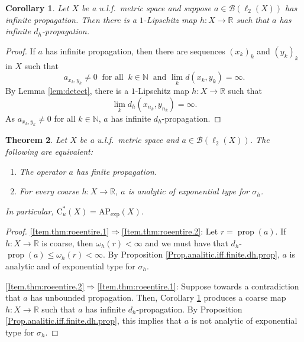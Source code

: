 \documentclass[11pt]{amsart}
\newcommand{\R}{\mathbb{R}}
\newcommand{\N}{\mathbb{N}}
\newcommand{\B}{\mathcal{B}}
\newcommand{\cstu}{\mathrm{C}^*_u}
\numberwithin{equation}{section}
\newtheorem{theorem}{Theorem}[section]
\newtheorem{corollary}[theorem]{Corollary}
\theoremstyle{definition}
\theoremstyle{remark}
\DeclareMathOperator{\propg}{prop}
\begin{document}
\begin{corollary}\label{cor:detect} Let $X$ be a u.l.f.\ metric space and suppose $a\in\B(\ell_2(X))$ has infinite propagation. Then there is a $1$-Lipschitz map $h\colon X\to\R$ such that $a$ has infinite $d_h$-propagation.
\end{corollary}

\begin{proof}
If  $a$ has infinite propagation, then there are   sequences $(x_k)_k$ and $(y_k)_k$ in $X$ such that
\begin{equation*}
a_{x_k,y_k}\neq 0\ \text{ for all }\ k\in \N\ \text{ and }\lim_kd(x_k,y_k)=\infty.
\end{equation*}
By Lemma \ref{lem:detect}, there is a $1$-Lipschitz map $h\colon X\to \R$ such that \[\lim_kd_h(x_{n_k},y_{n_k})=\infty.\] As $a_{x_k,y_k}\neq 0$ for all $k\in\N$, $a$ has infinite $d_h$-propagation.
\end{proof}


\begin{theorem}\label{thm:roeentire}
Let $X$ be a u.l.f.\ metric space and $a\in\B(\ell_2(X))$. The following are equivalent:
\begin{enumerate}
\item \label{Item.thm:roeentire.1} The operator $a$ has finite propagation.
\item \label{Item.thm:roeentire.2}   For every coarse $h\colon X\to\R$, $a$ is   analytic of  exponential type for $\sigma_h$.
\end{enumerate}
In particular,
$
\cstu(X) =\mathrm{AP}_{\exp}(X).
$
\end{theorem}

\begin{proof}
\eqref{Item.thm:roeentire.1}$\Rightarrow$\eqref{Item.thm:roeentire.2}: Let $r=\propg(a)$. If $h\colon X\to \R$ is coarse,    then $\omega_h(r)<\infty$ and we must have that $d_h$-$\propg(a)\leq \omega_h(r)<\infty$. By Proposition  \ref{Prop.analitic.iff.finite.dh.prop}, $a$ is analytic and of exponential type for $\sigma_h$.

\eqref{Item.thm:roeentire.2}$\Rightarrow$\eqref{Item.thm:roeentire.1}: Suppose towards a contradiction that $a$ has unbounded propagation. Then, Corollary \ref{cor:detect} produces a coarse map $h\colon X\to\R$  such that $a$ has infinite $d_h$-propagation. By Proposition \ref{Prop.analitic.iff.finite.dh.prop}, this implies that $a$ is not analytic of exponential type   for $\sigma_h$.
\end{proof}
\end{document}

